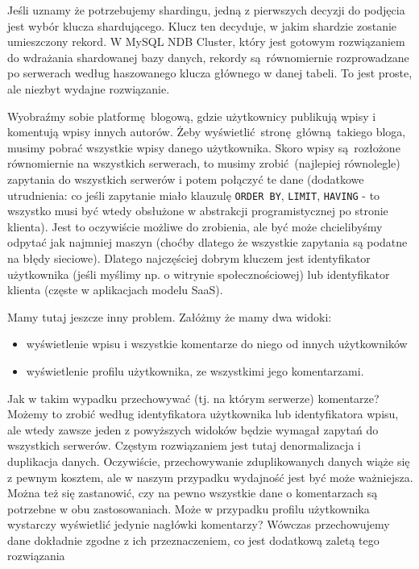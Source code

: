 \documentclass[a4paper,12pt]{article}
\begin{document}
Jeśli uznamy że potrzebujemy shardingu, jedną z pierwszych decyzji do podjęcia jest wybór klucza shardującego. Klucz ten decyduje, w jakim shardzie zostanie umieszczony rekord. W MySQL NDB Cluster, który jest gotowym rozwiązaniem do wdrażania shardowanej bazy danych, rekordy są równomiernie rozprowadzane po serwerach według haszowanego klucza głównego w danej tabeli. To jest proste, ale niezbyt wydajne rozwiązanie.

Wyobraźmy sobie platformę blogową, gdzie użytkownicy publikują wpisy i komentują wpisy innych autorów. Żeby wyświetlić stronę główną takiego bloga, musimy pobrać wszystkie wpisy danego użytkownika. Skoro wpisy są rozłożone równomiernie na wszystkich serwerach, to musimy zrobić (najlepiej równolegle) zapytania do wszystkich serwerów i potem połączyć te dane (dodatkowe utrudnienia: co jeśli zapytanie miało klauzulę \texttt{ORDER BY}, \texttt{LIMIT}, \texttt{HAVING} - to wszystko musi być wtedy obsłużone w abstrakcji programistycznej po stronie klienta). Jest to oczywiście możliwe do zrobienia, ale być może chcielibyśmy odpytać jak najmniej maszyn (choćby dlatego że wszystkie zapytania są podatne na błędy sieciowe). Dlatego najczęściej dobrym kluczem jest identyfikator użytkownika (jeśli myślimy np. o witrynie społecznościowej) lub identyfikator klienta (częste w aplikacjach modelu SaaS).

Mamy tutaj jeszcze inny problem. Załóżmy że mamy dwa widoki:
\begin{itemize}
 \setlength{\itemsep}{0.06cm}
 \setlength{\parskip}{0.06cm}
 \item wyświetlenie wpisu i wszystkie komentarze do niego od innych użytkowników
 \item wyświetlenie profilu użytkownika, ze wszystkimi jego komentarzami.
\end{itemize}
Jak w takim wypadku przechowywać (tj. na którym serwerze) komentarze? Możemy to zrobić według identyfikatora użytkownika lub identyfikatora wpisu, ale wtedy zawsze jeden z powyższych widoków będzie wymagał zapytań do wszystkich serwerów. Częstym rozwiązaniem jest tutaj denormalizacja i duplikacja danych. Oczywiście, przechowywanie zduplikowanych danych wiąże się z pewnym kosztem, ale w naszym przypadku wydajność jest być może ważniejsza. Można też się zastanowić, czy na pewno wszystkie dane o komentarzach są potrzebne w obu zastosowaniach. Może w przypadku profilu użytkownika wystarczy wyświetlić jedynie nagłówki komentarzy? Wówczas przechowujemy dane dokładnie zgodne z ich przeznaczeniem, co jest dodatkową zaletą tego rozwiązania
\end{document}
